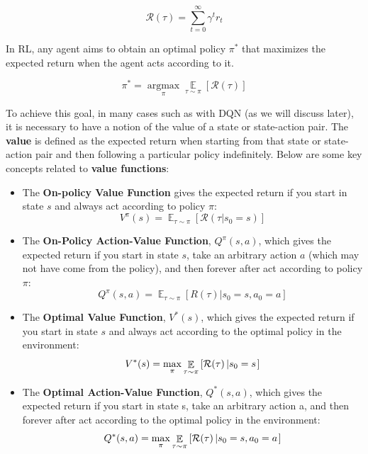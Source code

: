 $$\mathcal{R}(\tau) = \sum_{t=0}^\infty \gamma^t r_t$$

In RL, any agent aims to obtain an optimal policy $\pi^\ast$ that maximizes the expected return when the agent acts according to it.

\begin{equation}
    \pi^\ast = \operatorname*{arg max}_\pi \mathop{\mathbb{E}}\limits_{\tau \sim \pi}\left[\mathcal{R}(\tau) \right]
\label{eq:rl_objective}
\end{equation}

To achieve this goal, in many cases such as with DQN (as we will discuss later), it is necessary to have a notion of the value of a state or state-action pair. The \textbf{value} is defined as the expected return when starting from that state or state-action pair and then following a particular policy indefinitely. Below are some key concepts related to \textbf{value functions}:

\begin{itemize}
    \item The \textbf{On-policy Value Function} gives the expected return if you start in state $s$ and always act according to policy $\pi$:
    \begin{equation}
    V^\pi(s) = \mathop{\mathbb E}_{\tau \sim \pi} \left[\mathcal{R}(\tau | s_0 = s)\right]
    \end{equation}
    \item The \textbf{On-Policy Action-Value Function}, $Q^{\pi}(s,a)$, which gives the expected return if you start in state $s$, take an arbitrary action $a$ (which may not have come from the policy), and then forever after act according to policy $\pi$:
    \begin{equation}
    Q^{\pi}(s,a) = \mathop{\mathbb E}_{\tau \sim \pi}\left[R(\tau)\left| s_0 = s, a_0 = a\right.\right]
    \end{equation}
    \item The \textbf{Optimal Value Function}, $V^*(s)$, which gives the expected return if you start in state $s$ and always act according to the optimal policy in the environment:
    \begin{equation}
    V^*(s) = \max_{\pi} \mathop{\mathbb{E}}\limits_{\tau \sim \pi}\left[\mathcal{R}(\tau)\left| s_0 = s\right.\right]
    \end{equation}
    \item The \textbf{Optimal Action-Value Function}, $Q^*(s,a)$, which gives the expected return if you start in state s, take an arbitrary action a, and then forever after act according to the optimal policy in the environment:
    \begin{equation}
        Q^*(s,a) = \max_{\pi} \mathop{\mathbb{E}}\limits_{\tau \sim \pi}\left[\mathcal{R}(\tau)\left| s_0 = s, a_0 = a\right.\right]
        \label{eq:q_optimal_value}
    \end{equation}


\end{itemize}

